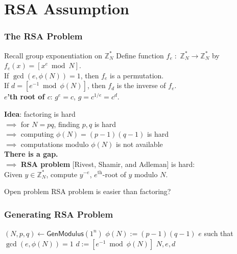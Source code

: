 \section{RSA Assumption}
\begin{frame}\frametitle{The RSA Problem}
\begin{block}{Recall group exponentiation on $\mathbb{Z}^*_N$}
Define function $f_e\;:$ $\mathbb{Z}^*_N \to \mathbb{Z}^*_N$ by $f_e(x) =[x^e \bmod N]$. \\ If $\gcd(e,\phi(N))=1$, then $f_e$ is a permutation. \\
If $d = [e^{-1} \bmod \phi(N)]$, then $f_d$ is the inverse of $f_e$.\\
\textbf{$e$'th root of $c$}: $g^e = c$, $g = c^{1/e} = c^{d}$. 
\end{block}
\textbf{Idea}: factoring is hard\\ $\implies$ for $N=pq$, finding $p,q$ is hard\\ $\implies$ computing $\phi(N)=(p-1)(q-1)$ is hard\\ $\implies$ computations modulo $\phi(N)$ is not available\\ 
\alert{\textbf{There is a gap.}}\\
$\implies$ \textbf{RSA problem} [Rivest, Shamir, and Adleman] is hard:\\
Given $y \in \mathbb{Z}^*_N$, compute $y^{-e}$, $e^{\text{th}}$-root of $y$ modulo $N$.
\begin{alertblock}{Open problem}
RSA problem is easier than factoring?
\end{alertblock}
\end{frame}
\begin{frame}\frametitle{Generating RSA Problem}
\begin{algorithm}[H]
\DontPrintSemicolon
\caption{$\mathsf{GenRSA}$}
\BlankLine
$(N,p,q) \gets \mathsf{GenModulus}(1^n)$\;
$\phi(N) := (p-1)(q-1)$\;
\KwF $e$ such that $\gcd(e,\phi(N))=1$\;
\KwC $d := [e^{-1} \bmod \phi(N)]$\;
\Return $N,e,d$\;
\end{algorithm}
\end{frame}
